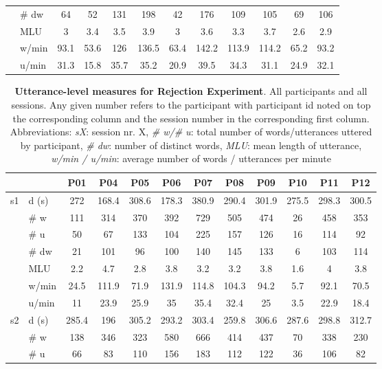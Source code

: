 \begin{screenonly}
\begin{table*}[h]
\begin{tabular*}{\hsize}{@{\extracolsep{\fill}}clcccccccccc}
    & \# dw & 64 & 52 & 131 & 198 & 42 & 176 & 109 & 105 & 69 & 106\\
    & MLU & 3 & 3.4 & 3.5 & 3.9 & 3 & 3.6 & 3.3 & 3.7 & 2.6 & 2.9\\
    & w/min & 93.1 & 53.6 & 126 & 136.5 & 63.4 & 142.2 & 113.9 & 114.2 & 65.2 & 93.2\\
    & u/min & 31.3 & 15.8 & 35.7 & 35.2 & 20.9 & 39.5 & 34.3 & 31.1 & 24.9 & 32.1\\
    \bottomrule
  \end{tabular*}
\end{table*}
\begin{table*}[h]
\caption{\textbf{Utterance-level measures for Rejection Experiment}. All participants and all sessions. Any given number refers
    to the participant with participant id noted on top the corresponding column and the session number in the corresponding
    first column. Abbreviations: \textsl{sX}: session nr. X, \textsl{\# w/\# u}: total number of words/utterances uttered by participant,
    \textsl{\# dw}: number of distinct words, \textsl{MLU}: mean length of utterance, \textsl{w/min / u/min}: average number of words /
    utterances per minute}
  \label{tbl_ul_rej}
  \begin{tabular*}{\hsize}{@{\extracolsep{\fill}}clcccccccccc}
    \toprule
    & & P01 & P04 & P05 & P06 & P07 & P08 & P09 & P10 & P11 & P12\\
    \midrule
    \multirow{7}{*}{s1} & d (s) & 272 & 168.4 & 308.6 & 178.3 & 380.9 & 290.4 & 301.9 & 275.5 & 298.3 & 300.5\\
    & \# w & 111 & 314 & 370 & 392 & 729 & 505 & 474 & 26 & 458 & 353\\
    & \# u & 50 & 67 & 133 & 104 & 225 & 157 & 126 & 16 & 114 & 92\\
    & \# dw & 21 & 101 & 96 & 100 & 140 & 145 & 133 & 6 & 103 & 114\\
    & MLU & 2.2 & 4.7 & 2.8 & 3.8 & 3.2 & 3.2 & 3.8 & 1.6 & 4 & 3.8\\
    & w/min & 24.5 & 111.9 & 71.9 & 131.9 & 114.8 & 104.3 & 94.2 & 5.7 & 92.1 & 70.5\\
    & u/min & 11 & 23.9 & 25.9 & 35 & 35.4 & 32.4 & 25 & 3.5 & 22.9 & 18.4\\
    \cmidrule{2-12}
    \multirow{7}{*}{s2} & d (s) & 285.4 & 196 & 305.2 & 293.2 & 303.4 & 259.8 & 306.6 & 287.6 & 298.8 & 312.7\\
    & \# w & 138 & 346 & 323 & 580 & 666 & 414 & 437 & 70 & 338 & 230\\
    & \# u & 66 & 83 & 110 & 156 & 183 & 112 & 122 & 36 & 106 & 82\\

\end{tabular*}
\end{table*}
\end{screenonly}
